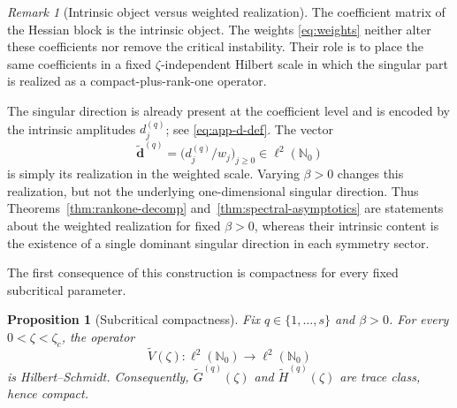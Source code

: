 \documentclass[11pt]{amsart}
\numberwithin{equation}{section}
\theoremstyle{plain}
\newtheorem{proposition}[theorem]{Proposition}
\theoremstyle{definition}
\theoremstyle{remark}
\newtheorem{remark}[theorem]{Remark}
\newcommand{\NN}{\mathbb{N}}
\begin{document}
\begin{remark}[Intrinsic object versus weighted realization]
	\label{rem:renorm-intrinsic}
	The coefficient matrix of the Hessian block is the intrinsic object. The weights \eqref{eq:weights} neither alter these coefficients nor remove the critical instability. Their role is to place the same coefficients in a fixed $\zeta$-independent Hilbert scale in which the singular part is realized as a compact-plus-rank-one operator.

	The singular direction is already present at the coefficient level and is
	encoded by the intrinsic amplitudes \(d_j^{(q)}\); see
	\eqref{eq:app-d-def}. The vector
	\[
		\widetilde{\bm d}^{(q)}
		=
		\bigl(d_j^{(q)}/w_j\bigr)_{j\ge0}\in\ell^2(\NN_0)
	\]
	is simply its realization in the weighted scale. Varying \(\beta>0\) changes
	this realization, but not the underlying one-dimensional singular direction.
	Thus Theorems~\ref{thm:rankone-decomp}
	and~\ref{thm:spectral-asymptotics} are statements about the weighted
	realization for fixed \(\beta>0\), whereas their intrinsic content is the
	existence of a single dominant singular direction in each symmetry sector.
\end{remark}

The first consequence of this construction is compactness for every fixed
subcritical parameter.

\begin{proposition}[Subcritical compactness]
	\label{prop:subcrit-compact}
	Fix \(q\in\{1,\dots,s\}\) and \(\beta>0\). For every \(0<\zeta<\zeta_c\),
	the operator
	\[
		\widetilde V(\zeta):\ell^2(\NN_0)\to\ell^2(\NN_0)
	\]
	is Hilbert--Schmidt. Consequently,
	\(\widetilde G^{(q)}(\zeta)\) and \(\widetilde H^{(q)}(\zeta)\) are
	trace class, hence compact.
\end{proposition}
\end{document}
